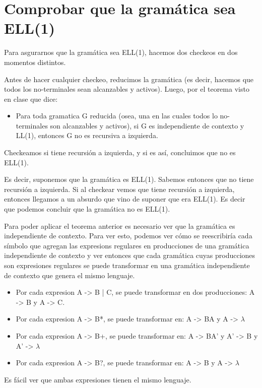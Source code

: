 \documentclass[a4paper]{report}
\begin{document}
\section*{Comprobar que la gram\'atica sea ELL(1)}

Para asgurarnos que la gramática sea ELL(1), hacemos dos checkeos en dos
momentos distintos.


Antes de hacer cualquier checkeo, reducimos la gramática (es
decir, hacemos que todos los no-terminales sean alcanzables y activos). Luego,
por el teorema visto en clase que dice:
\begin{itemize}
\item Para toda gramatica G reducida (osea, una en las cuales todos lo
	no-terminales son alcanzables y activos), si G es independiente de contexto
	y LL(1), entonces G no es recursiva a izquierda.
\end{itemize}


Checkeamos si tiene recursión a izquierda, y si es así, concluimos que no es
ELL(1).


Es decir, suponemos que la gramática es ELL(1). Sabemos entonces que no
tiene recursión a izquierda. Si al checkear vemos que tiene recursión a
izquierda, entonces llegamos a un absurdo que vino de suponer que era ELL(1). Es
decir que podemos concluir que la gramática no es ELL(1).


Para poder aplicar el teorema anterior es necesario ver que la gramática es
independiente de contexto. Para ver esto, podemos ver cómo se reescribiría cada
símbolo que agregan las expresions regulares en producciones de una gramática
independiente de contexto y ver entonces que cada gramática cuyas producciones
son expresiones regulares se puede transformar en una gramática independiente de
contexto que genera el mismo lenguaje.

\begin{itemize}
\item Por cada expresion A -> B | C, se puede transformar en dos producciones: A -> B
y A -> C.
\item Por cada expresion A -> B*, se puede transformar en: A -> BA y A -> $\lambda$
\item Por cada expresion A -> B+, se puede transformar en: A -> BA' y A' -> B y A' -> $\lambda$
\item Por cada expresion A -> B?, se puede transformar en: A -> B y A -> $\lambda$
\end{itemize}


Es fácil ver que ambas expresiones tienen el mismo lenguaje.
\end{document}
